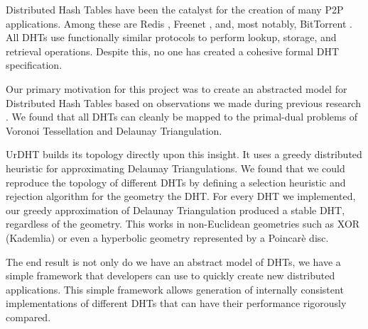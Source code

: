 Distributed Hash Tables have been the catalyst for the creation of many P2P applications.
Among these are Redis \cite{redis}, Freenet \cite{freenet}, and, most notably, BitTorrent \cite{bittorrent}. 
All DHTs use functionally similar protocols to perform lookup, storage, and retrieval operations.
Despite this, no one has created a cohesive formal DHT specification.

Our primary motivation for this project was to create an abstracted model for Distributed Hash Tables based on observations we made during previous research \cite{dgvh}.
We found that all DHTs can cleanly be mapped to the primal-dual problems of Voronoi Tessellation and Delaunay Triangulation.

UrDHT builds its topology directly upon this insight.
It uses a greedy distributed heuristic for approximating Delaunay Triangulations.
We found that we could reproduce the topology of different DHTs by defining a selection heuristic and rejection algorithm for the geometry the DHT.
For every DHT we implemented, our greedy approximation of Delaunay Triangulation produced a stable DHT, regardless of the geometry.  
This works in non-Euclidean geometries such as XOR (Kademlia) or even a hyperbolic geometry represented by a Poincar\`{e} disc.

The end result is not only do we have an abstract model of DHTs, we have a simple framework that developers can use to quickly create new distributed applications.
This simple framework allows generation of internally consistent implementations of different DHTs that can have their performance rigorously compared.  %



%
%

